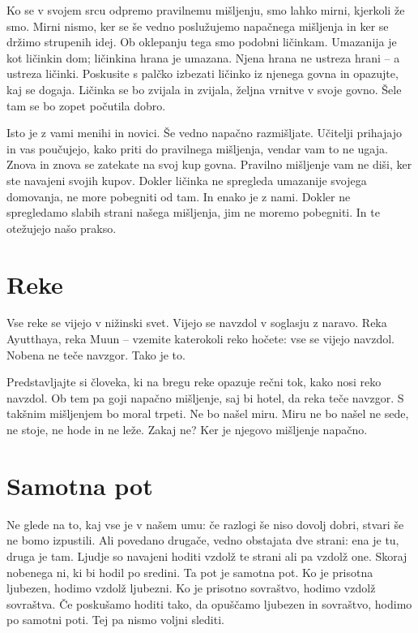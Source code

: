 Ko se v svojem srcu odpremo pravilnemu mišljenju, smo lahko mirni, kjerkoli že smo. Mirni nismo, ker se še vedno poslužujemo napačnega mišljenja in ker se držimo strupenih idej. Ob oklepanju tega smo podobni ličinkam. Umazanija je kot ličinkin dom; ličinkina hrana je umazana. Njena hrana ne ustreza hrani – a ustreza ličinki. Poskusite s palčko izbezati ličinko iz njenega govna in opazujte, kaj se dogaja. Ličinka se bo zvijala in zvijala, željna vrnitve v svoje govno. Šele tam se bo zopet počutila dobro.

Isto je z vami menihi in novici. Še vedno napačno razmišljate. Učitelji prihajajo in vas poučujejo, kako priti do pravilnega mišljenja, vendar vam to ne ugaja. Znova in znova se zatekate na svoj kup govna. Pravilno mišljenje vam ne diši, ker ste navajeni svojih kupov. Dokler ličinka ne spregleda umazanije svojega domovanja, ne more pobegniti od tam. In enako je z nami. Dokler ne spregledamo slabih strani našega mišljenja, jim ne moremo pobegniti. In te otežujejo našo prakso.

\section{Reke}

Vse reke se vijejo v nižinski svet. Vijejo se navzdol v soglasju z naravo. Reka Ayutthaya, reka Muun – vzemite katerokoli reko hočete: vse se vijejo navzdol. Nobena ne teče navzgor. Tako je to.

Predstavljajte si človeka, ki na bregu reke opazuje rečni tok, kako nosi reko navzdol. Ob tem pa goji napačno mišljenje, saj bi hotel, da reka teče navzgor. S takšnim mišljenjem bo moral trpeti. Ne bo našel miru. Miru ne bo našel ne sede, ne stoje, ne hode in ne leže. Zakaj ne? Ker je njegovo mišljenje napačno.

\section{Samotna pot}

Ne glede na to, kaj vse je v našem umu: če razlogi še niso dovolj dobri, stvari še ne bomo izpustili. Ali povedano drugače, vedno obstajata dve strani: ena je tu, druga je tam. Ljudje so navajeni hoditi vzdolž te strani ali pa vzdolž one. Skoraj nobenega ni, ki bi hodil po sredini. Ta pot je samotna pot. Ko je prisotna ljubezen, hodimo vzdolž ljubezni. Ko je prisotno sovraštvo, hodimo vzdolž sovraštva. Če poskušamo hoditi tako, da opuščamo ljubezen in sovraštvo, hodimo po samotni poti. Tej pa nismo voljni slediti.

